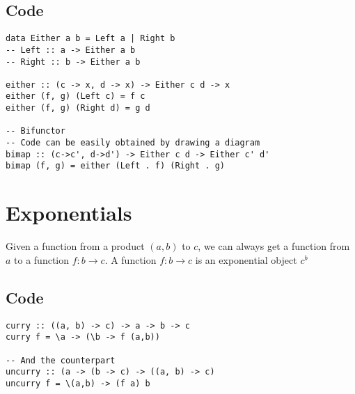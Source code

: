 \documentclass[11pt]{article}
\begin{document}
\subsection{Code}
\label{sec:org4033af4}
\begin{verbatim}
data Either a b = Left a | Right b
-- Left :: a -> Either a b
-- Right :: b -> Either a b

either :: (c -> x, d -> x) -> Either c d -> x
either (f, g) (Left c) = f c
either (f, g) (Right d) = g d

-- Bifunctor
-- Code can be easily obtained by drawing a diagram
bimap :: (c->c', d->d') -> Either c d -> Either c' d'
bimap (f, g) = either (Left . f) (Right . g)
\end{verbatim}

\section{Exponentials}
\label{sec:org938c44b}
Given a function from a product \((a, b)\) to \(c\), we can always get a function
from \(a\) to a function \(f: b \to c\). A function \(f: b \to c\) is an exponential
object \(c^b\)

\subsection{Code}
\label{sec:org5c6e419}
\begin{verbatim}
curry :: ((a, b) -> c) -> a -> b -> c
curry f = \a -> (\b -> f (a,b))

-- And the counterpart
uncurry :: (a -> (b -> c) -> ((a, b) -> c)
uncurry f = \(a,b) -> (f a) b
\end{verbatim}
\end{document}

